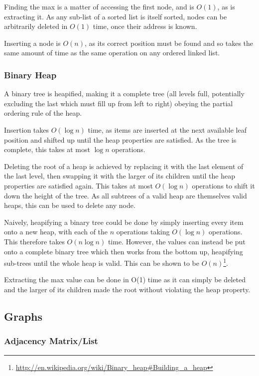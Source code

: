 \documentclass[]{article}
\begin{document}
Finding the max is a matter of accessing the first node, and is $O(1)$, as is extracting it. As any sub-list of a sorted list is itself sorted, nodes can be arbitrarily deleted in $O(1)$ time, once their address is known.

Inserting a node is $O(n)$, as its correct position must be found and so takes the same amount of time as the same operation on any ordered linked list.

\subsubsection{Binary Heap}

A binary tree is heapified, making it a complete tree (all levels full, potentially excluding the last which must fill up from left to right) obeying the partial ordering rule of the heap.

Insertion takes $O(\log{n})$ time, as items are inserted at the next available leaf position and shifted up until the heap properties are satisfied. As the tree is complete, this takes at most $\log{n}$ operations.

Deleting the root of a heap is achieved by replacing it with the last element of the last level, then swapping it with the larger of its children until the heap properties are satisfied again. This takes at most $O(\log{n})$ operations to shift it down the height of the tree. As all subtrees of a valid heap are themselves valid heaps, this can be used to delete any node.

Naively, heapifying a binary tree could be done by simply inserting every item onto a new heap, with each of the $n$ operations taking $O(\log{n})$ operations. This therefore takes $O(n\log{n})$ time. However, the values can instead be put onto a complete binary tree which then works from the bottom up, heapifying sub-trees until the whole heap is valid. This can be shown to be $O(n)$\footnote{\url{http://en.wikipedia.org/wiki/Binary\_heap\#Building\_a\_heap}}.

Extracting the max value can be done in O(1) time as it can simply be deleted and the larger of its children made the root without violating the heap property.

\pagebreak

\subsection{Graphs}

\subsubsection{Adjacency Matrix/List}
\end{document}
